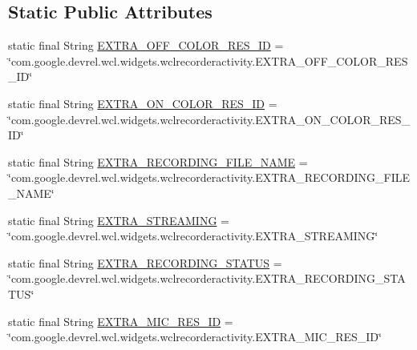 \subsection*{Static Public Attributes}
\begin{DoxyCompactItemize}
\item 
static final String \hyperlink{classcom_1_1google_1_1devrel_1_1wcl_1_1widgets_1_1recording_1_1WclRecorderActivity_a8f7a44233b6b1f98a3c86c032549b1be}{E\+X\+T\+R\+A\+\_\+\+O\+F\+F\+\_\+\+C\+O\+L\+O\+R\+\_\+\+R\+E\+S\+\_\+\+ID} = \char`\"{}com.\+google.\+devrel.\+wcl.\+widgets.\+wclrecorderactivity.\+E\+X\+T\+R\+A\+\_\+\+O\+F\+F\+\_\+\+C\+O\+L\+O\+R\+\_\+\+R\+E\+S\+\_\+\+ID\char`\"{}
\item 
static final String \hyperlink{classcom_1_1google_1_1devrel_1_1wcl_1_1widgets_1_1recording_1_1WclRecorderActivity_ae793125650ff6c0d3e760e121dd6486c}{E\+X\+T\+R\+A\+\_\+\+O\+N\+\_\+\+C\+O\+L\+O\+R\+\_\+\+R\+E\+S\+\_\+\+ID} = \char`\"{}com.\+google.\+devrel.\+wcl.\+widgets.\+wclrecorderactivity.\+E\+X\+T\+R\+A\+\_\+\+O\+N\+\_\+\+C\+O\+L\+O\+R\+\_\+\+R\+E\+S\+\_\+\+ID\char`\"{}
\item 
static final String \hyperlink{classcom_1_1google_1_1devrel_1_1wcl_1_1widgets_1_1recording_1_1WclRecorderActivity_ad719ab444b60947d01d2f94c4f5e48c7}{E\+X\+T\+R\+A\+\_\+\+R\+E\+C\+O\+R\+D\+I\+N\+G\+\_\+\+F\+I\+L\+E\+\_\+\+N\+A\+ME} = \char`\"{}com.\+google.\+devrel.\+wcl.\+widgets.\+wclrecorderactivity.\+E\+X\+T\+R\+A\+\_\+\+R\+E\+C\+O\+R\+D\+I\+N\+G\+\_\+\+F\+I\+L\+E\+\_\+\+N\+A\+ME\char`\"{}
\item 
static final String \hyperlink{classcom_1_1google_1_1devrel_1_1wcl_1_1widgets_1_1recording_1_1WclRecorderActivity_a936b85e81af33279b334a432049c94ee}{E\+X\+T\+R\+A\+\_\+\+S\+T\+R\+E\+A\+M\+I\+NG} = \char`\"{}com.\+google.\+devrel.\+wcl.\+widgets.\+wclrecorderactivity.\+E\+X\+T\+R\+A\+\_\+\+S\+T\+R\+E\+A\+M\+I\+NG\char`\"{}
\item 
static final String \hyperlink{classcom_1_1google_1_1devrel_1_1wcl_1_1widgets_1_1recording_1_1WclRecorderActivity_a65100261a9067825939ab2f876b1f099}{E\+X\+T\+R\+A\+\_\+\+R\+E\+C\+O\+R\+D\+I\+N\+G\+\_\+\+S\+T\+A\+T\+US} = \char`\"{}com.\+google.\+devrel.\+wcl.\+widgets.\+wclrecorderactivity.\+E\+X\+T\+R\+A\+\_\+\+R\+E\+C\+O\+R\+D\+I\+N\+G\+\_\+\+S\+T\+A\+T\+US\char`\"{}
\item 
static final String \hyperlink{classcom_1_1google_1_1devrel_1_1wcl_1_1widgets_1_1recording_1_1WclRecorderActivity_a026134c2cb913fb4ed2300ad0dfa0edd}{E\+X\+T\+R\+A\+\_\+\+M\+I\+C\+\_\+\+R\+E\+S\+\_\+\+ID} = \char`\"{}com.\+google.\+devrel.\+wcl.\+widgets.\+wclrecorderactivity.\+E\+X\+T\+R\+A\+\_\+\+M\+I\+C\+\_\+\+R\+E\+S\+\_\+\+ID\char`\"{}

\end{DoxyCompactItemize}
